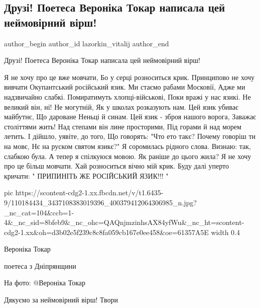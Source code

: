  
 
 
 
 
 
\subsection{Друзі! Поетеса Вероніка Токар написала цей неймовірний вірш!}
\label{sec:17_07_2020.fb.lazorkin_vitalij.1.veronika_tokar_virsh_mova}
 
\ifcmt
 author_begin
   author_id lazorkin_vitalij
 author_end
\fi

Друзі! Поетеса Вероніка Токар написала цей неймовірний вірш!

\begin{multicols}{2}
\obeycr
Я не хочу про це вже мовчати,
Бо у серці розноситься крик.
Принципово не хочу вивчати
Окупантський російський язик.
\smallskip
Ми стаємо рабами Московії,
Адже ми надзвичайно слабкі.
Помиратимуть хлопці-військові,
Поки вражі у нас язикі.
\smallskip
Не великий він, ні! Не могутній,
Як у школах розказують нам.
Цей язик убиває майбутнє,
Що дароване Неньці й синам.
\smallskip
Цей язик - зброя нашого ворога,
Заважає століттями жить!
Над степами він лине просторими,
Під горами й над морем летить.
\smallskip
І дійшло, уявіте, до того,
Що говорять: "Что ето такє?
Почему говоріш ти на мовє,
Нє на руском святом язикє?"
\smallskip
Я соромилась рідного слова.
Визнаю: так, слабкою була.
А тепер я спілкуюся мовою.
Як раніше до цього жила?
\smallskip
Я не хочу про це більш мовчати.
Хай розноситься вічно мій крик.
Буду далі уперто кричати:
\smallskip
" ПРИПИНІТЬ ЖЕ РОСІЙСЬКИЙ ЯЗИК!!! "
\restorecr
\end{multicols}

\ifcmt
  pic https://scontent-cdg2-1.xx.fbcdn.net/v/t1.6435-9/110184434_3437108383019396_400379412064306985_n.jpg?_nc_cat=104&ccb=1-4&_nc_sid=8bfeb9&_nc_ohc=QAQnjmzinhsAX84yfWu&_nc_ht=scontent-cdg2-1.xx&oh=d3b02e5f239c8c8fa059cb167e0ee458&oe=61357A5E
  width 0.4
\fi

Вероніка Токар

поетеса з Дніпрянщини

На фото: @Вероніка Токар 

Дякуємо за неймовірний вірш! Твори💙💛
